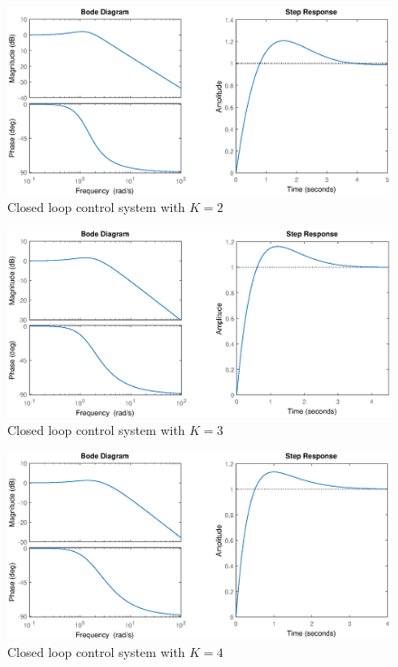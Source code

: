 \documentclass{article}
\begin{document}
	\begin{figure}[h]
		\centering
		\includegraphics[scale=0.5]{fig3.eps}
		\caption{Closed loop control system with $K = 2$}
	\end{figure}
	
	\begin{figure}[h]
		\centering
		\includegraphics[scale=0.5]{fig4.eps}
		\caption{Closed loop control system with $K = 3$}
	\end{figure}
	
	\begin{figure}[h]
		\centering
		\includegraphics[scale=0.5]{fig5.eps}
		\caption{Closed loop control system with $K = 4$}
	\end{figure}
	
\end{document}

